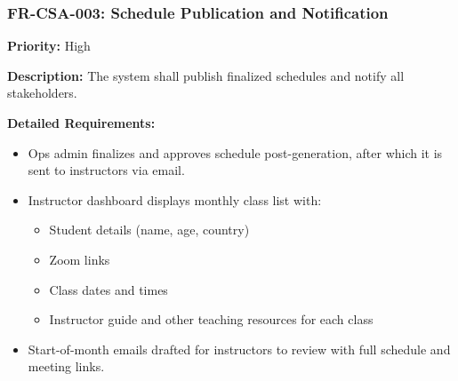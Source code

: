 

\subsubsection{FR-CSA-003: Schedule Publication and Notification}
\textbf{Priority:} High  

\textbf{Description:} The system shall publish finalized schedules and notify all stakeholders.

\textbf{Detailed Requirements:}
\begin{itemize}
    \item Ops admin finalizes and approves schedule post-generation, after which it is sent to instructors via email.
    \item Instructor dashboard displays monthly class list with:
    \begin{itemize}
        \item Student details (name, age, country)
        \item Zoom links
        \item Class dates and times
        \item Instructor guide and other teaching resources for each class
    \end{itemize}
    \item Start-of-month emails drafted for instructors to review with full schedule and meeting links.
\end{itemize}

